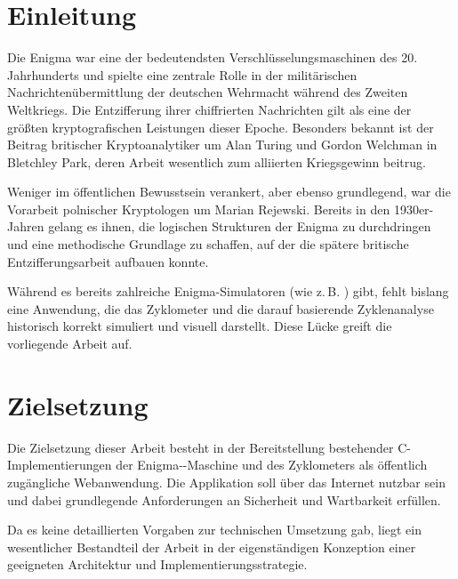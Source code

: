 \documentclass[12pt, ngerman, a4paper, numbers=noenddot]{article}
\begin{document}
\newpage
{}
\renewcommand{\thepage}{\arabic{page}}



	



\newpage

\glsaddall

\section{Einleitung}

Die Enigma war eine der bedeutendsten Verschlüsselungsmaschinen des 20. Jahrhunderts und spielte eine zentrale Rolle in der militärischen Nachrichtenübermittlung der deutschen Wehrmacht während des Zweiten Weltkriegs. Die Entzifferung ihrer chiffrierten Nachrichten gilt als eine der größten kryptografischen Leistungen dieser Epoche. Besonders bekannt ist der Beitrag britischer Kryptoanalytiker um Alan Turing und Gordon Welchman in Bletchley Park, deren Arbeit wesentlich zum alliierten Kriegsgewinn beitrug. 

Weniger im öffentlichen Bewusstsein verankert, aber ebenso grundlegend, war die Vorarbeit polnischer Kryptologen um Marian Rejewski. Bereits in den 1930er-Jahren gelang es ihnen, die logischen Strukturen der Enigma zu durchdringen und eine methodische Grundlage zu schaffen, auf der die spätere britische Entzifferungsarbeit aufbauen konnte.

Während es bereits zahlreiche Enigma-Simulatoren (wie z.\,B. \autocite{enigma_simulator_palloks}) gibt, fehlt bislang eine Anwendung, die das Zyklometer und die darauf basierende Zyklenanalyse historisch korrekt simuliert und visuell darstellt. Diese Lücke greift die vorliegende Arbeit auf.

\newpage
\section{Zielsetzung}
Die Zielsetzung dieser Arbeit besteht in der Bereitstellung bestehender C\hyp{}Im\-ple\-men\-tie\-run\-gen der Enigma-\hyp{}Maschine und des Zyklometers als öffentlich zugängliche Webanwendung. Die Applikation soll über das Internet nutzbar sein und dabei grundlegende Anforderungen an Sicherheit und Wartbarkeit erfüllen.  


Da es keine detaillierten Vorgaben zur technischen Umsetzung gab, liegt ein wesentlicher Bestandteil der Arbeit in der eigenständigen Konzeption einer geeigneten Architektur und Implementierungsstrategie.  
\end{document}
